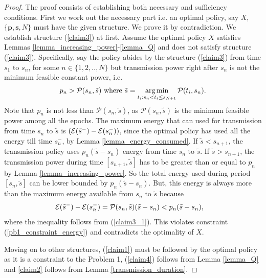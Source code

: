 \begin{proof}

The proof consists of establishing both necessary and sufficiency conditions. First we work out the necessary part i.e. an optimal policy, say $X$, $\{\textbf{p},\textbf{s},N\}$ must have the given structure. We prove it by contradiction. We establish structure (\ref{claim3}) at first. Assume the optimal policy $X$ satisfies Lemmas \ref{lemma_increasing_power}-\ref{lemma_Q} and does not satisfy structure (\ref{claim3}). Specifically, say the policy abides by the  structure (\ref{claim3}) from time $s_{1}$ to $s_n$, for some $n\in \{1,2,..,N\}$ but transmission power right after $s_n$ is not the minimum feasible constant power, i.e.
\begin{align}
p_n>\mathcal{P}(s_n,\tilde{s})\text{ where } \tilde{s}=\argmin_{t_i: s_n < t_i \le s_{N+1}} \mathcal{P}(t_i,s_n).\label{claim3_1}
\end{align}
Note that $p_n$ is not less than $\mathcal{P}(s_n,\tilde{s})$, as $\mathcal{P}(s_n,\tilde{s})$ is the minimum feasible power among all the epochs. The maximum energy that can used for transmission from time $s_{n}$ to $\tilde{s}$ is $\left(\mathcal{E}(\tilde{s}^-)-\mathcal{E}(s_{n}^-)\right)$, since the optimal policy has used all the energy till time $s_{n}^-$, by Lemma \ref{lemma_energy_consumed}. If $\tilde{s}<s_{n+1}$, the transmission policy uses $p_n(\tilde{s}-s_{n})$ energy from time $s_n$ to $\tilde{s}$. If $\tilde{s}>s_{n+1}$, the transmission power during time $[s_{n+1},\tilde{s}]$ has to be greater than or equal to $p_n$ by Lemma \ref{lemma_increasing_power}. So the total energy used during period $[s_n,\tilde{s}]$ can be lower bounded by $p_n(\tilde{s}-s_{n})$. But, this energy is always more than the maximum energy available from $s_{n}$ to $\tilde{s}$ because
\begin{align}
&\nonumber\mathcal{E}(\tilde{s}^-)-\mathcal{E}(s_{n}^-)=\mathcal{P}(s_n,\tilde{s})(\tilde{s}-s_{n})<p_n(\tilde{s}-s_{n}),
\end{align}
where the inequality follows from (\ref{claim3_1}). This violates constraint (\ref{pb1_constraint_energy}) and contradicts the optimality of $X$.

Moving on to other structures, (\ref{claim1}) must be followed by the optimal policy as it is a constraint to the Problem 1, (\ref{claim4}) follows from Lemma \ref{lemma_Q} and \eqref{claim2} follows from Lemma \ref{transmission_duration}.


\end{proof}
